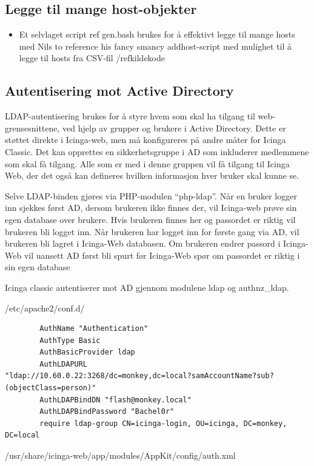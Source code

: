 \subsection{Legge til mange host-objekter}
\begin{itemize}
	\item Et selvlaget script ref gen.bash brukes for å effektivt legge til mange hosts med Nils to reference his fancy smancy addhost-script med mulighet til å legge til hosts fra CSV-fil /ref{kildekode}
\end{itemize}
\subsection{Autentisering mot Active Directory} 
LDAP-autentisering brukes for å styre hvem som skal ha tilgang til web-grensesnittene, ved hjelp av grupper og brukere i Active Directory. Dette er støttet direkte i Icinga-web, men må konfigureres på andre måter for Icinga Classic. Det kan opprettes en sikkerhetsgruppe i AD som inkluderer medlemmene som skal få tilgang. Alle som er med i denne gruppen vil få tilgang til Icinga Web, der det også kan defineres hvilken informasjon hver bruker skal kunne se. 

Selve LDAP-binden gjøres via PHP-modulen “php-ldap”. Når en bruker logger inn sjekkes først AD, dersom brukeren ikke finnes der, vil Icinga-web prøve sin egen database over brukere. Hvis brukeren finnes her og passordet er riktig vil brukeren bli logget inn. Når brukeren har logget inn for første gang via AD, vil brukeren bli lagret i Icinga-Web databasen. Om brukeren endrer passord i Icinga-Web vil uansett AD først bli spurt før Icinga-Web spør om passordet er riktig i sin egen database

Icinga classic autentiserer mot AD gjennom modulene ldap og authnz\_ldap.

/etc/apache2/conf.d/

\begin{lstlisting}
        AuthName "Authentication"
        AuthType Basic
        AuthBasicProvider ldap
        AuthLDAPURL
"ldap://10.60.0.22:3268/dc=monkey,dc=local?samAccountName?sub?(objectClass=person)"
        AuthLDAPBindDN "flash@monkey.local"
        AuthLDAPBindPassword "Bachel0r"
        require ldap-group CN=icinga-login, OU=icinga, DC=monkey, DC=local
\end{lstlisting}

/usr/share/icinga-web/app/modules/AppKit/config/auth.xml

